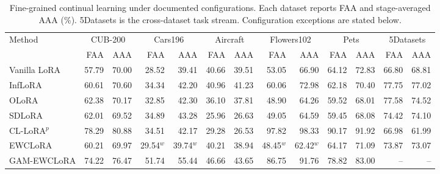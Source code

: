 \begin{table}[t]
\centering
\caption{Fine-grained continual learning under documented configurations. Each dataset reports FAA and stage-averaged AAA (\%). 5Datasets is the cross-dataset task stream. Configuration exceptions are stated below.}
\label{tab:exp_fine}
\scriptsize\setlength{\tabcolsep}{2.2pt}\renewcommand{\arraystretch}{1.08}
\begin{tabular*}{\linewidth}{@{\extracolsep{\fill}}l*{12}{r}@{}}
\toprule
Method & \multicolumn{2}{c}{CUB-200} & \multicolumn{2}{c}{Cars196} & \multicolumn{2}{c}{Aircraft} & \multicolumn{2}{c}{Flowers102} & \multicolumn{2}{c}{Pets} & \multicolumn{2}{c}{5Datasets}\\
\cmidrule(lr){2-3}\cmidrule(lr){4-5}\cmidrule(lr){6-7}\cmidrule(lr){8-9}\cmidrule(lr){10-11}\cmidrule(lr){12-13}
 & FAA & AAA & FAA & AAA & FAA & AAA & FAA & AAA & FAA & AAA & FAA & AAA\\\midrule
Vanilla LoRA & 57.79 & 70.00 & 28.52 & 39.41 & 40.66 & 39.51 & 53.05 & 66.90 & 64.12 & 72.83 & 66.80 & 68.81\\
InfLoRA & 60.61 & 70.60 & 34.34 & 42.20 & 40.96 & 41.23 & 60.06 & 72.98 & 62.18 & 70.40 & 77.75 & 77.02\\
OLoRA & 62.38 & 70.17 & 32.85 & 42.30 & 36.10 & 37.81 & 48.90 & 64.26 & 59.52 & 68.01 & 77.58 & 74.52\\
SDLoRA & 62.01 & 69.52 & 34.89 & 43.28 & 25.96 & 26.63 & 49.05 & 64.59 & 59.45 & 68.08 & 74.42 & 74.10\\
CL-LoRA$^{p}$ & 78.29 & 80.88 & 34.51 & 42.17 & 29.28 & 26.53 & 97.82 & 98.33 & 90.17 & 91.92 & 66.98 & 61.99\\
EWCLoRA & 60.21 & 69.97 & 29.54$^{w}$ & 39.74$^{w}$ & 40.21 & 38.94 & 48.45$^{w}$ & 62.42$^{w}$ & 64.17 & 71.09 & 73.87 & 73.07\\
GAM-EWCLoRA & 74.22 & 76.47 & 51.74 & 55.44 & 46.66 & 43.65 & 86.75 & 91.76 & 78.82 & 83.00 & -- & --\\
\bottomrule\end{tabular*}
\par\vspace{3pt}\begin{minipage}{\linewidth}\scriptsize

\end{minipage}
\end{table}
